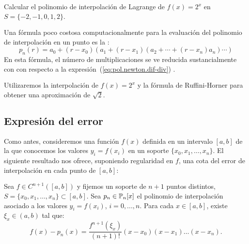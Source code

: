 \begin{example}
  Calcular el polinomio de interpolación de Lagrange de $f(x)=2^x$ en
  $S=\{-2,-1,0,1,2\}$. 
\end{example}

Una fórmula poco costosa computacionalmente para la evaluación del
polinomio de interpolación en un punto es la : 
\begin{equation*}
  p_n(r) = a_0 + (r-x_0)(a_1 + (r-x_1)(a_2 + \cdots + (r-x_n)a_n)\cdots)
\end{equation*}
En esta fórmula, el número de multiplicaciones se ve reducida
sustancialmente con con respecto a la
expresión~(\ref{eq:pol.newton.dif-div}) .
\begin{example}
  Utilizaremos la interpolación de $f(x)=2^x$ y la fórmula de
  Ruffini-Horner para obtener una aproximación de $\sqrt{2}$.
\end{example}

\subsection{Expresión del error}
\label{sec:error-interpol-lagrange}
Como antes, consideremos una función $f(x)$ definida en un intervalo
$[a,b]$ de la que conocemos los valores $y_i=f(x_i)$ en un soporte
$\{x_0,x_1,\dots,x_n\}$. El siguiente resultado nos ofrece, suponiendo
regularidad en $f$, una cota del error de interpolación en cada punto
de $[a,b]$:
\begin{theorem}
  \label{thm:error-interpol-lagrange}
  Sea $f\in C^{n+1}([a,b])$ y fijemos un soporte de $n+1$ puntos
  distintos, $S=\{x_0,x_1,\dots,x_n\}\subset[a,b]$. Sea
  $p_n\in\operatorname{{\mathbb P}}_n[x]$ el polinomio de interpolación asociado a los valores
  $y_i=f(x_i)$, $i=0,...,n$. Para cada $x\in[a,b]$, existe $\xi_x\in
  (a,b)$ tal que:
  \begin{equation}
    \label{eq:expresion-error-interpol}
    f(x)-p_n(x)=\frac{f^{n+1}(\xi_x)}{(n+1)!} (x-x_0)(x-x_1)\dots(x-x_n).
  \end{equation}
\end{theorem}

